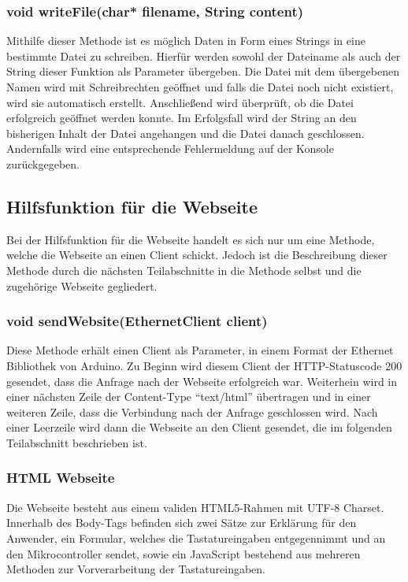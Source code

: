 \subsubsection{void writeFile(char* filename, String content)}
Mithilfe dieser Methode ist es möglich Daten in Form eines Strings in eine bestimmte Datei zu schreiben. Hierfür werden sowohl der Dateiname als auch der String dieser Funktion als Parameter übergeben. Die Datei mit dem übergebenen Namen wird mit Schreibrechten geöffnet und falls die Datei noch nicht existiert, wird sie automatisch erstellt. Anschließend wird überprüft, ob die Datei erfolgreich geöffnet werden konnte. Im Erfolgsfall wird der String an den bisherigen Inhalt der Datei angehangen und die Datei danach geschlossen. Andernfalls wird eine entsprechende Fehlermeldung auf der Konsole zurückgegeben.



\subsection{Hilfsfunktion für die Webseite}
Bei der Hilfsfunktion für die Webseite handelt es sich nur um eine Methode, welche die Webseite an einen Client schickt. Jedoch ist die Beschreibung dieser Methode durch die nächsten Teilabschnitte in die Methode selbst und die zugehörige Webseite gegliedert.

\subsubsection{void sendWebsite(EthernetClient client)}
Diese Methode erhält einen Client als Parameter, in einem Format der Ethernet Bibliothek von Arduino. Zu Beginn wird diesem Client der HTTP-Statuscode 200 gesendet, dass die Anfrage nach der Webseite erfolgreich war. Weiterhein wird in einer nächsten Zeile der Content-Type ``text/html'' übertragen und in einer weiteren Zeile, dass die Verbindung nach der Anfrage geschlossen wird. Nach einer Leerzeile wird dann die Webseite an den Client gesendet, die im folgenden Teilabschnitt beschrieben ist.

\subsubsection{HTML Webseite}
Die Webseite besteht aus einem validen HTML5-Rahmen mit UTF-8 Charset. Innerhalb des Body-Tags befinden sich zwei Sätze zur Erklärung für den Anwender, ein Formular, welches die Tastatureingaben entgegennimmt und an den Mikrocontroller sendet, sowie ein JavaScript bestehend aus mehreren Methoden zur Vorverarbeitung der Tastatureingaben.

